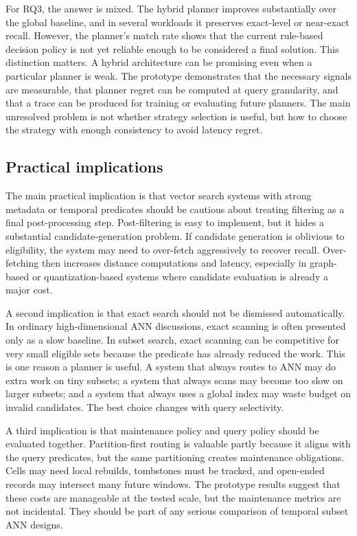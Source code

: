 \documentclass[sigconf,nonacm]{acmart}
\begin{document}
For RQ3, the answer is mixed. The hybrid planner improves substantially over the global baseline, and in several workloads it preserves exact-level or near-exact recall. However, the planner's match rate shows that the current rule-based decision policy is not yet reliable enough to be considered a final solution. This distinction matters. A hybrid architecture can be promising even when a particular planner is weak. The prototype demonstrates that the necessary signals are measurable, that planner regret can be computed at query granularity, and that a trace can be produced for training or evaluating future planners. The main unresolved problem is not whether strategy selection is useful, but how to choose the strategy with enough consistency to avoid latency regret.

\subsection{Practical implications}

The main practical implication is that vector search systems with strong metadata or temporal predicates should be cautious about treating filtering as a final post-processing step. Post-filtering is easy to implement, but it hides a substantial candidate-generation problem. If candidate generation is oblivious to eligibility, the system may need to over-fetch aggressively to recover recall. Over-fetching then increases distance computations and latency, especially in graph-based or quantization-based systems where candidate evaluation is already a major cost.

A second implication is that exact search should not be dismissed automatically. In ordinary high-dimensional ANN discussions, exact scanning is often presented only as a slow baseline. In subset search, exact scanning can be competitive for very small eligible sets because the predicate has already reduced the work. This is one reason a planner is useful. A system that always routes to ANN may do extra work on tiny subsets; a system that always scans may become too slow on larger subsets; and a system that always uses a global index may waste budget on invalid candidates. The best choice changes with query selectivity.

A third implication is that maintenance policy and query policy should be evaluated together. Partition-first routing is valuable partly because it aligns with the query predicates, but the same partitioning creates maintenance obligations. Cells may need local rebuilds, tombstones must be tracked, and open-ended records may intersect many future windows. The prototype results suggest that these costs are manageable at the tested scale, but the maintenance metrics are not incidental. They should be part of any serious comparison of temporal subset ANN designs.
\end{document}
